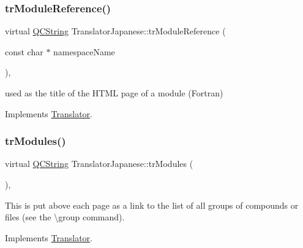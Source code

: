 \mbox{\label{class_translator_japanese_ae35118a010e47e6b72e583c8339e61ec}} 
\subsubsection{\texorpdfstring{trModuleReference()}{trModuleReference()}}
{\footnotesize\ttfamily virtual \mbox{\hyperlink{class_q_c_string}{Q\+C\+String}} Translator\+Japanese\+::tr\+Module\+Reference (\begin{DoxyParamCaption}\item[{const char $\ast$}]{namespace\+Name }\end{DoxyParamCaption})\hspace{0.3cm}{\ttfamily [inline]}, {\ttfamily [virtual]}}

used as the title of the H\+T\+ML page of a module (Fortran) 

Implements \mbox{\hyperlink{class_translator}{Translator}}.

\mbox{\label{class_translator_japanese_a1fb3baf66fdddeaaa291d12fe8cb080b}} 
\subsubsection{\texorpdfstring{trModules()}{trModules()}}
{\footnotesize\ttfamily virtual \mbox{\hyperlink{class_q_c_string}{Q\+C\+String}} Translator\+Japanese\+::tr\+Modules (\begin{DoxyParamCaption}{ }\end{DoxyParamCaption})\hspace{0.3cm}{\ttfamily [inline]}, {\ttfamily [virtual]}}

This is put above each page as a link to the list of all groups of compounds or files (see the \textbackslash{}group command). 

Implements \mbox{\hyperlink{class_translator}{Translator}}.

\mbox{\label{class_translator_japanese_a055f2850d4543ca3bde12af63114ac78}} 
